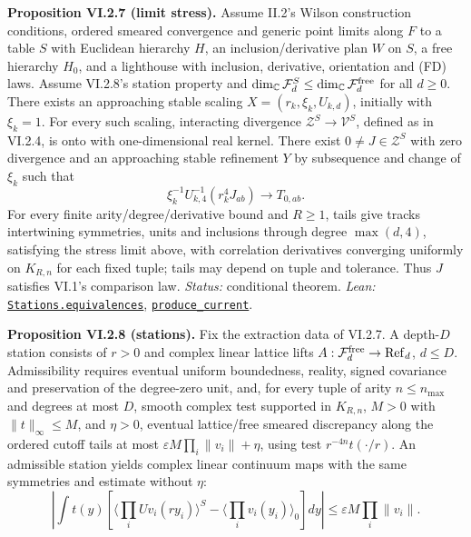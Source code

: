 \documentclass[
  letterpaper,
  11pt]{article}
\begin{document}
\textbf{Proposition VI.2.7 (limit stress).} Assume II.2's Wilson
construction conditions, ordered smeared convergence and generic point
limits along \(F\) to a table \(S\) with Euclidean hierarchy \(H\), an
inclusion/derivative plan \(W\) on \(S\), a free hierarchy \(H_0\), and
a lighthouse with inclusion, derivative, orientation and (FD) laws.
Assume VI.2.8's station property and
\(\dim_{\mathbb C}\mathcal F_d^S\le\dim_{\mathbb C}\mathcal F_d^{\rm free}\)
for all \(d\ge0\). There exists an approaching stable scaling
\(X=(r_k,\xi_k,U_{k,d})\), initially with \(\xi_k=1\). For every such
scaling, interacting divergence \(\mathcal Z^S\to\mathcal V^S\), defined
as in VI.2.4, is onto with one-dimensional real kernel. There exist
\(0\ne J\in\mathcal Z^S\) with zero divergence and an approaching stable
refinement \(Y\) by subsequence and change of \(\xi_k\) such that
\[\xi_k^{-1}U_{k,4}^{-1}(r_k^4J_{ab})\to T_{0,ab}.\] For every finite
arity/degree/derivative bound and \(R\ge1\), tails give tracks
intertwining symmetries, units and inclusions through degree
\(\max(d,4)\), satisfying the stress limit above, with correlation
derivatives converging uniformly on \(K_{R,n}\) for each fixed tuple;
tails may depend on tuple and tolerance. Thus \(J\) satisfies VI.1's
comparison law. \emph{Status:} conditional theorem. \emph{Lean:}
\href{https://github.com/yang-mills-group/OpenAI-YM-20261028/blob/3456e5e75cf8d4cd558955a5c7638fba2d68f464/YM/Next/UV_STRESS/Invert.lean\#L132-L181}{\texttt{Stations.equivalences}},
\href{https://github.com/yang-mills-group/OpenAI-YM-20261028/blob/3456e5e75cf8d4cd558955a5c7638fba2d68f464/YM/Next/UV_STRESS/Limit.lean\#L129-L167}{\texttt{produce\_current}}.

\textbf{Proposition VI.2.8 (stations).} Fix the extraction data of
VI.2.7. A depth-\(D\) station consists of \(r>0\) and complex linear
lattice lifts \(A:\mathcal F_d^{\rm free}\to\mathrm{Ref}_d\),
\(d\le D\). Admissibility requires eventual uniform boundedness,
reality, signed covariance and preservation of the degree-zero unit,
and, for every tuple of arity \(n\le n_{\max}\) and degrees at most
\(D\), smooth complex test supported in \(K_{R,n}\), \(M>0\) with
\(\|t\|_\infty\le M\), and \(\eta>0\), eventual lattice/free smeared
discrepancy along the ordered cutoff tails at most
\(\varepsilon M\prod_i\|v_i\|+\eta\), using test \(r^{-4n}t(\cdot/r)\).
An admissible station yields complex linear continuum maps with the same
symmetries and estimate without \(\eta\):
\[\left|\int t(y)\left[\langle\prod_i Uv_i(ry_i)\rangle^S-\langle\prod_i v_i(y_i)\rangle_0\right]dy\right|\le\varepsilon M\prod_i\|v_i\|.\]
\end{document}
